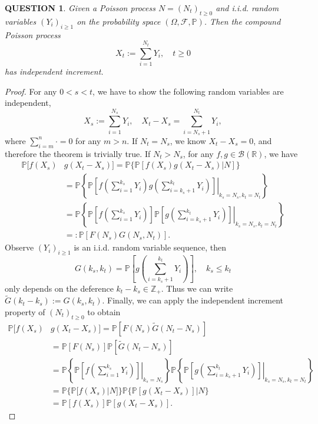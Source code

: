 \documentclass[12pt]{article}
\renewcommand{\b}{\mathscr{B}}
\renewcommand{\(}{\left(}%
\renewcommand{\)}{\right)}%
\renewcommand{\[}{\left[}%
\renewcommand{\]}{\right]}%
\renewcommand{\r}{\mathbb{R}}
\newcommand{\z}{\mathbb{Z}}
\newcommand{\p}{\mathbb{P}}
\newcommand{\f}{\mathscr{F}}
\newtheorem{question}{QUESTION}[section]}
\newtheorem{proof}{Proof.}}
\begin{document}
  \begin{question}
  	Given a Poisson process $N=(N_t)_{t\geq 0}$ and i.i.d. random variables $(Y_i)_{i\geq 1}$ on the probability space $(\Omega,\f,\p)$. Then the compound Poisson process
  	\begin{equation*}
  		X_t:=\sum_{i=1}^{N_t}Y_i,\quad t\geq 0
  	\end{equation*}
  	has independent increment.
  \end{question}
  \begin{proof}
  	For any $0<s<t$, we have to show the following random variables are independent, 
  	\begin{equation*}
  		X_s:=\sum_{i=1}^{N_s}Y_i,\quad X_t-X_s=\sum_{i=N_s+1}^{N_t}Y_i,
  	\end{equation*}
  	where $\sum_{i=m}^n\cdot=0$ for any $m>n$. If $N_t=N_s$, we know $X_t-X_s=0$, and therefore the theorem is trivially true. If $N_t>N_s$, for any $f,g\in\b(\r)$, we have
  	\begin{equation*}
  		\begin{split}
  			\p[f(X_s)&g(X_t-X_s)]=\p\{\p[f(X_s)g(X_t-X_s)|N]\}\\
  			&=\p\left\{\p\[\left.f\(\sum_{i=1}^{k_s}Y_i\)g\(\sum_{i=k_s+1}^{k_t}Y_i\)\]\right|_{k_s=N_s,k_t=N_t}\right\}\\
  			&=\p\left\{\p\[\left.f\(\sum_{i=1}^{k_s}Y_i\)\]\p\[g\(\sum_{i=k_s+1}^{k_t}Y_i\)\]\right|_{k_s=N_s,k_t=N_t}\right\}\\
  			&=:\p[F(N_s)G(N_s,N_t)].
  		\end{split}
  	\end{equation*}
  	Observe $(Y_i)_{i\geq 1}$ is an i.i.d. random variable sequence, then 
  	\begin{equation*}
  		G(k_s,k_t)=\p\[g\(\sum_{i=k_s+1}^{k_t}Y_i\)\],\quad k_s\leq k_t
  	\end{equation*}
  	only depends on the deference $k_t-k_s\in\z_+$. Thus we can write $\widetilde{G}(k_t-k_s):=G(k_s,k_t)$. Finally, we can apply the independent increment property of $(N_t)_{t\geq 0}$ to obtain
  	\begin{equation*}
  		\begin{split}
  			\p[f(X_s)&g(X_t-X_s)]=\p[F(N_s)\widetilde{G}(N_t-N_s)]\\
  			&=\p[F(N_s)]\p[\widetilde{G}(N_t-N_s)]\\
  			&=\p\left\{\p\[\left.f\(\sum_{i=1}^{k_s}Y_i\)\]\right|_{k_s=N_s}\right\}\p\left\{\left.\p\[g\(\sum_{i=k_s+1}^{k_t}Y_i\)\]\right|_{k_s=N_s,k_t=N_t}\right\}\\
  			&=\p\{\p[f(X_s)|N]\}\p\{\p[g(X_t-X_s)]|N\}\\
  			&=\p[f(X_s)]\p[g(X_t-X_s)].
  		\end{split}
  	\end{equation*}
  \end{proof}
  
\end{document}
